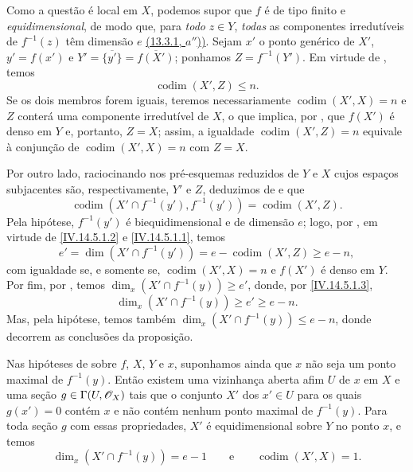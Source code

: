 Como a questão é local em $X$, podemos supor que $f$ é de tipo finito e \emph{equidimensional}, de modo que, para \emph{todo} $z\in Y$, \emph{todas} as componentes irredutíveis de $f^{-1}(z)$ têm dimensão $e$ {\hyperlink{ega4.c04.prop.13-3-1}{(13.3.1, $a''$))}}.
Sejam $x'$ o ponto genérico de $X'$, $y'=f(x')$ e $Y'=\overline{\{y'\}}=\overline{f(X')}$; ponhamos $Z=f^{-1}(Y')$.
Em virtude de , temos
\begin{equation}
  \operatorname{codim}(X',Z)\leq n.
  \tag{14.5.1.1}\label{IV.14.5.1.1}
\end{equation}
Se os dois membros forem iguais, teremos necessariamente $\operatorname{codim}(X',X)=n$ e $Z$ conterá uma componente irredutível de $X$, o que implica, por , que $f(X')$ é denso em $Y$ e, portanto, $Z=X$; assim, a igualdade $\operatorname{codim}(X',Z)=n$ equivale à conjunção de $\operatorname{codim}(X',X)=n$ com $Z=X$.

Por outro lado, raciocinando nos pré-esquemas reduzidos de $Y$ e $X$ cujos espaços subjacentes são, respectivamente, $Y'$ e $Z$, deduzimos de  e  que
\begin{equation}
  \operatorname{codim}(X'\cap f^{-1}(y'),f^{-1}(y'))=\operatorname{codim}(X',Z).
  \tag{14.5.1.2}\label{IV.14.5.1.2}
\end{equation}
Pela hipótese, $f^{-1}(y')$ é biequidimensional  e de dimensão $e$; logo, por , em virtude de \eqref{IV.14.5.1.2} e \eqref{IV.14.5.1.1}, temos
\begin{equation}
  e'=\dim(X'\cap f^{-1}(y'))=e-\operatorname{codim}(X',Z)\geq e-n,
  \tag{14.5.1.3}\label{IV.14.5.1.3}
\end{equation}
com igualdade se, e somente se, $\operatorname{codim}(X',X)=n$ e $f(X')$ é denso em $Y$.
Por fim, por , temos $\dim_x(X'\cap f^{-1}(y))\geq e'$, donde, por \eqref{IV.14.5.1.3},
\begin{equation}
  \dim_x(X'\cap f^{-1}(y))\geq e'\geq e-n.
  \tag{14.5.1.4}\label{IV.14.5.1.4}
\end{equation}
Mas, pela hipótese, temos também $\dim_x(X'\cap f^{-1}(y))\leq e-n$, donde decorrem as conclusões da proposição.

\begin{corollary}[14.5.2]
\label{IV.14.5.2}
Nas hipóteses de  sobre $f$, $X$, $Y$ e $x$, suponhamos ainda que $x$ não seja um ponto maximal de $f^{-1}(y)$.
Então existem uma vizinhança aberta afim $U$ de $x$ em $X$ e uma seção $g\in\Gamma(U,\mathscr{O}_X)$ tais que o conjunto $X'$ dos $x'\in U$ para os quais $g(x')=0$ contém $x$ e não contém nenhum ponto maximal de $f^{-1}(y)$.
Para toda seção $g$ com essas propriedades, $X'$ é equidimensional sobre $Y$ no ponto $x$, e temos
\begin{equation}
  \dim_x(X'\cap f^{-1}(y))=e-1 \qquad\text{e}\qquad \operatorname{codim}(X',X)=1.
  \tag{14.5.2.1}\label{IV.14.5.2.1}
\end{equation}
\end{corollary}

